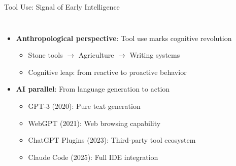 \documentclass[aspectratio=169]{beamer}
\begin{document}
\begin{frame}{Tool Use: Signal of Early Intelligence}
	\begin{columns}
		\column{\textwidth}
		\begin{itemize}
			\item {\color{highlight}\textbf{Anthropological perspective}}: Tool use marks cognitive revolution
			\begin{itemize}
				\item Stone tools $\rightarrow$ Agriculture $\rightarrow$ Writing systems
				\item Cognitive leap: from reactive to proactive behavior
			\end{itemize}
			\item {\color{highlight}\textbf{AI parallel}}: From language generation to action
			\begin{itemize}
				\item GPT-3 (2020): Pure text generation
				\item WebGPT (2021): Web browsing capability
				\item ChatGPT Plugins (2023): Third-party tool ecosystem
				\item Claude Code (2025): Full IDE integration
			\end{itemize}
		\end{itemize}
	\end{columns}
\end{frame}
\end{document}
